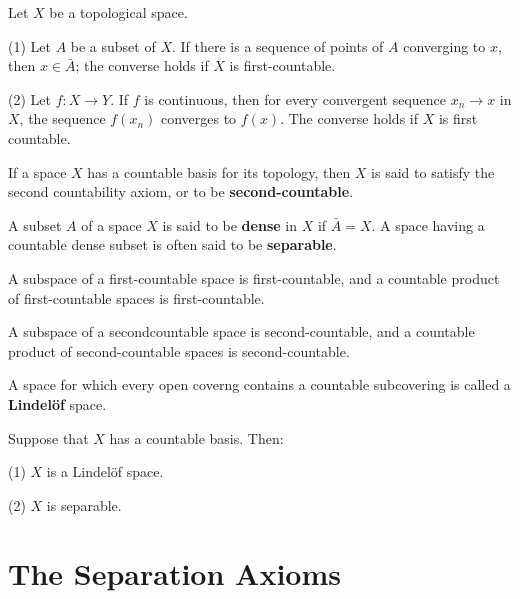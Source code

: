 \documentclass[12pt, a4paper, oneside]{book}
\begin{document}
\begin{theorem}
    Let $X$ be a topological space.

    (1) Let $A$ be a subset of $X$. If there is a sequence of points of $A$ converging to $x$, then $x \in \bar{A}$; the converse holds if $X$ is first-countable.

    (2) Let $f: X \rightarrow Y$. If $f$ is continuous, then for every convergent sequence $x_n \rightarrow x$ in $X$, the sequence $f\left(x_n\right)$ converges to $f(x)$. The converse holds if $X$ is first countable.
\end{theorem}

\begin{definition}
    If a space $X$ has a countable basis for its topology, then $X$ is said to satisfy the second countability axiom, or to be \textbf{second-countable}.
\end{definition}

\begin{definition}
    A subset $A$ of a space $X$ is said to be \textbf{dense} in $X$ if $\bar{A}=X$.
    A space having a countable dense subset is often said to be \textbf{separable}.
\end{definition}



\begin{theorem}
    A subspace of a first-countable space is first-countable, and a countable product of first-countable spaces is first-countable.

    A subspace of a secondcountable space is second-countable, and a countable product of second-countable spaces is second-countable.
\end{theorem}

\begin{definition}
    A space for which every open coverng contains a countable subcovering is called a \textbf{Lindelöf} space.
\end{definition}

\begin{theorem}
    Suppose that $X$ has a countable basis. Then:

    (1) $X$ is a Lindelöf space.

    (2) $X$ is separable.
\end{theorem}



\section{The Separation Axioms}  %
\end{document}
